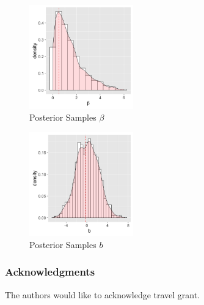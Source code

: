 \documentclass{article}
\begin{document}
\begin{figure}[h]
  \centering
  \includegraphics[width=0.4\textwidth]{histogram_beta_posterior}
  \caption{Posterior Samples $\beta$}
  \label{fig:beta}
\end{figure}

\begin{figure}[h]
  \centering
  \includegraphics[width=0.4\textwidth]{histogram_b_posterior}
  \caption{Posterior Samples $b$}
  \label{fig:b}
\end{figure}

\subsubsection*{Acknowledgments}

The authors would like to acknowledge travel grant.

\medskip

\small


\end{document}
